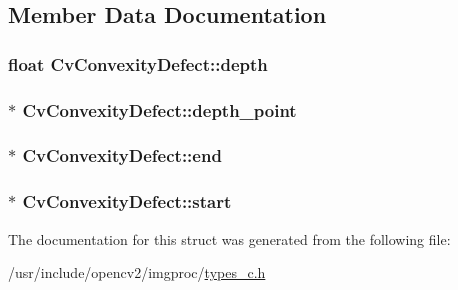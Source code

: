 \subsection{Member Data Documentation}
\hypertarget{structCvConvexityDefect_aa176ccc3afe0af7aa25e65f1ec849cc4}{
\subsubsection[{depth}]{\setlength{\rightskip}{0pt plus 5cm}float Cv\-Convexity\-Defect\-::depth}}\label{structCvConvexityDefect_aa176ccc3afe0af7aa25e65f1ec849cc4}
\hypertarget{structCvConvexityDefect_a36b87ca2851365c18ad6b9c361b820f1}{
\subsubsection[{depth\-\_\-point}]{$\ast$ Cv\-Convexity\-Defect\-::depth\-\_\-point}}\label{structCvConvexityDefect_a36b87ca2851365c18ad6b9c361b820f1}
\hypertarget{structCvConvexityDefect_ac0e20e337f3a9eeaf845f1e45f0d8529}{
\subsubsection[{end}]{$\ast$ Cv\-Convexity\-Defect\-::end}}\label{structCvConvexityDefect_ac0e20e337f3a9eeaf845f1e45f0d8529}
\hypertarget{structCvConvexityDefect_a77610777f5d9932bc370db1c80476993}{
\subsubsection[{start}]{$\ast$ Cv\-Convexity\-Defect\-::start}}\label{structCvConvexityDefect_a77610777f5d9932bc370db1c80476993}


The documentation for this struct was generated from the following file\-:\begin{DoxyCompactItemize}
\item 
/usr/include/opencv2/imgproc/\hyperlink{imgproc_2types__c_8h}{types\-\_\-c.\-h}\end{DoxyCompactItemize}
